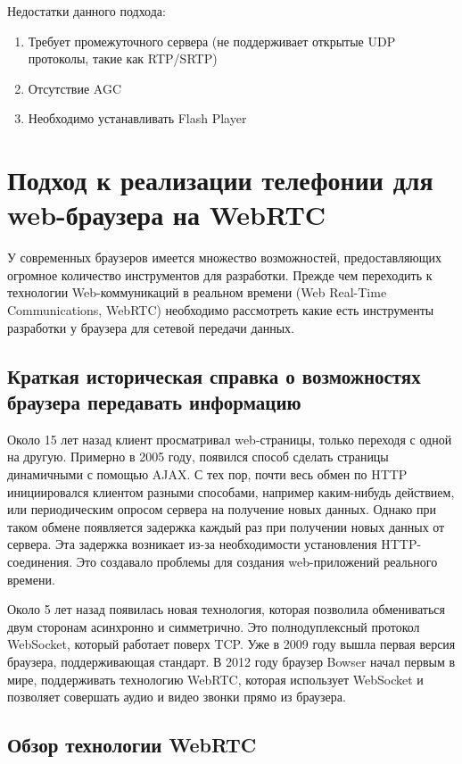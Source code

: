 Недостатки данного подхода:
\begin{enumerate}
\item Требует промежуточного сервера (не поддерживает открытые UDP протоколы, такие как RTP/SRTP)
\item Отсутствие AGC
\item Необходимо устанавливать Flash Player
\end{enumerate}

\section{Подход к реализации телефонии для web-браузера на WebRTC}

У современных браузеров имеется множество возможностей, предоставляющих огромное количество инструментов для разработки. Прежде чем переходить к технологии Web-коммуникаций в реальном времени (Web Real-Time Communications, WebRTC) необходимо рассмотреть какие есть инструменты разработки у браузера для сетевой передачи данных.

\subsection{Краткая историческая справка о возможностях браузера передавать информацию}

Около 15 лет назад клиент просматривал web-страницы, только переходя с одной на другую. Примерно в 2005 году, появился способ сделать страницы динамичными с помощью AJAX. С тех пор, почти весь обмен по HTTP инициировался клиентом разными способами, например каким-нибудь действием, или периодическим опросом сервера на получение новых данных. Однако при таком обмене появляется задержка каждый раз при получении новых данных от сервера. Эта задержка возникает из-за необходимости установления HTTP-соединения. Это создавало проблемы для создания web-приложений реального времени.\cite{ajax_problem}

Около 5 лет назад появилась новая технология, которая позволила обмениваться двум сторонам асинхронно и симметрично. Это полнодуплексный протокол WebSocket, который работает поверх TCP. Уже в 2009 году вышла первая версия браузера, поддерживающая стандарт.\cite{web_socket_begining} В 2012 году браузер Bowser начал первым в мире, поддерживать технологию WebRTC, которая использует WebSocket и позволяет совершать аудио и видео звонки прямо из браузера.\cite{bowser}

\subsection{Обзор технологии WebRTC}
\label{subsection:reviewWebRTC}

